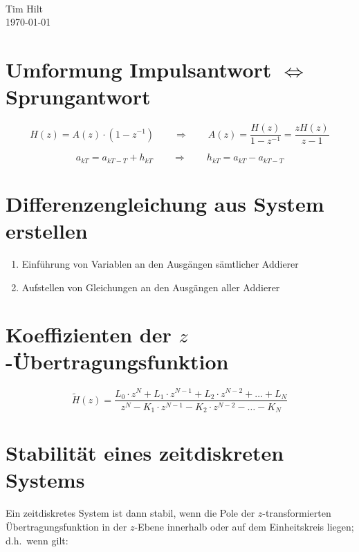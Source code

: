 \documentclass[twoside,10pt,a5paper]{scrartcl}
\begin{document}
\sffamily

\vspace*{1cm}

{\\[1ex]
  Tim Hilt\\
  \today
  \par}

\vspace{2cm}

\tableofcontents
\clearpage

\section{Umformung Impulsantwort $\mathbf{\Leftrightarrow}$ Sprungantwort}

\[H(z) = A(z) \cdot (1 - z^{-1}) \qquad\Rightarrow\qquad A(z) = \frac{H(z)}{1 - z^{-1}} = \frac{zH(z)}{z-1}\]

\[a_{kT} = a_{kT - T} + h_{kT} \qquad\Rightarrow\qquad h_{kT} = a_{kT} - a_{kT - T}\]

\section{Differenzengleichung aus System erstellen}

\begin{enumerate}
\item Einführung von Variablen an den Ausgängen sämtlicher Addierer
\item Aufstellen von Gleichungen an den Ausgängen aller Addierer
\end{enumerate}

\section{Koeffizienten der $z$-Übertragungsfunktion}

\[\tilde{H}(z) = \frac{L_0 \cdot z^N + L_1 \cdot z^{N-1} + L_2 \cdot z^{N-2} + \ldots+ L_N}{z^N - K_1 \cdot z^{N-1} - K_2\cdot z^{N-2} - \ldots - K_N}\]

\section{Stabilität eines zeitdiskreten Systems}

Ein zeitdiskretes System ist dann stabil, wenn die Pole der \(z\)-transformierten Übertragungsfunktion in der \(z\)-Ebene innerhalb oder auf dem Einheitskreis liegen; d.h.\ wenn gilt:
\end{document}
